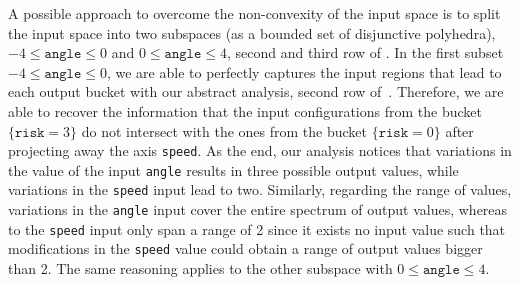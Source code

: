A possible approach to overcome the non-convexity of the input space is to split the input space into two subspaces (as a bounded set of disjunctive polyhedra), $-4 \le \texttt{angle} \le 0$ and $0 \le \texttt{angle} \le 4$, second and third row of .
In the first subset $-4 \le \texttt{angle} \le 0$, we are able to perfectly captures the input regions that lead to each output bucket with our abstract analysis, second row of~.
Therefore, we are able to recover the information that the input configurations from the bucket $\{\texttt{risk} =3\}$ do not intersect with the ones from the bucket $\{\texttt{risk} = 0\}$ after projecting away the axis \texttt{speed}.
As the end, our analysis notices that variations in the value of the input \texttt{angle} results in three possible output values, while variations in the \texttt{speed} input lead to two.
Similarly, regarding the range of values, variations in the \texttt{angle} input cover the entire spectrum of output values, whereas to the \texttt{speed} input only span a range of 2 since it exists no input value such that modifications in the \texttt{speed} value could obtain a range of output values bigger than 2.
The same reasoning applies to the other subspace with $0 \le \texttt{angle} \le 4$.
